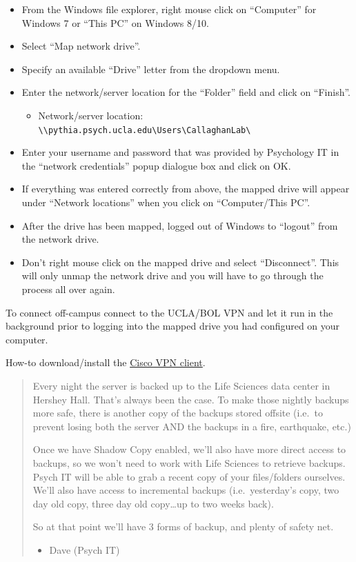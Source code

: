 \documentclass[]{book}
\providecommand{\tightlist}{%
  \setlength{\itemsep}{0pt}\setlength{\parskip}{0pt}}
\begin{document}
\begin{itemize}
\tightlist
\item
  From the Windows file explorer, right mouse click on ``Computer'' for Windows 7 or ``This PC'' on Windows 8/10.
\item
  Select ``Map network drive''.
\item
  Specify an available ``Drive'' letter from the dropdown menu.
\item
  Enter the network/server location for the ``Folder'' field and click on ``Finish''.

  \begin{itemize}
  \tightlist
  \item
    Network/server location: \texttt{\textbackslash{}\textbackslash{}pythia.psych.ucla.edu\textbackslash{}Users\textbackslash{}CallaghanLab\textbackslash{}}
  \end{itemize}
\item
  Enter your username and password that was provided by Psychology IT in the ``network credentials'' popup dialogue box and click on OK.
\item
  If everything was entered correctly from above, the mapped drive will appear under ``Network locations'' when you click on ``Computer/This PC''.
\item
  After the drive has been mapped, logged out of Windows to ``logout'' from the network drive.
\item
  Don't right mouse click on the mapped drive and select ``Disconnect''. This will only unmap the network drive and you will have to go through the process all over again.
\end{itemize}

To connect off-campus connect to the UCLA/BOL VPN and let it run in the background prior to logging into the mapped drive you had configured on your computer.

How-to download/install the \href{https://help.bol.ucla.edu/kb_view.do?sysparm_article=kb0010923}{Cisco VPN client}.

\begin{quote}
Every night the server is backed up to the Life Sciences data center in Hershey Hall. That's always been the case. To make those nightly backups more safe, there is another copy of the backups stored offsite (i.e.~to prevent losing both the server AND the backups in a fire, earthquake, etc.)

Once we have Shadow Copy enabled, we'll also have more direct access to backups, so we won't need to work with Life Sciences to retrieve backups. Psych IT will be able to grab a recent copy of your files/folders ourselves. We'll also have access to incremental backups (i.e.~yesterday's copy, two day old copy, three day old copy\ldots{}up to two weeks back).

So at that point we'll have 3 forms of backup, and plenty of safety net.

\begin{itemize}
\tightlist
\item
  Dave (Psych IT)
\end{itemize}
\end{quote}
\end{document}
